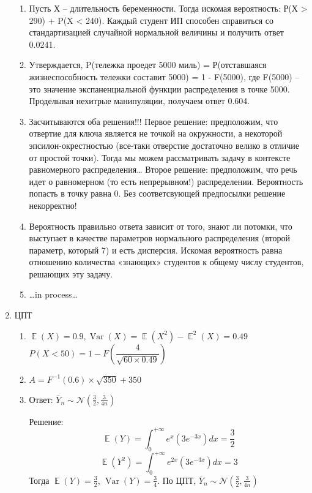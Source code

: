 \documentclass[11pt, a4paper]{article}
\DeclareMathOperator{\Var}{Var}
\DeclareMathOperator{\E}{\mathbb{E}}
\newcommand{\cN}{\mathcal{N}}
\theoremstyle{definition}
\begin{document}
\begin{enumerate}
\begin{enumerate}
    \item Пусть Х – длительность беременности. Тогда искомая вероятность: Р(Х > 290) + P(X < 240). Каждый студент ИП способен справиться со стандартизацией случайной нормальной величины и получить ответ 0.0241.
    \item Утверждается, P(тележка проедет 5000 миль) = Р(отставшаяся жизнеспособность тележки составит 5000) = 1 - F(5000), где F(5000) – это значение экспаненциальной функции распределения в точке 5000. Проделывая нехитрые манипуляции, получаем ответ 0.604.
    \item Засчитываются оба решения!!!
    Первое решение: предположим, что отвертие для ключа является не точкой на окружности, а некоторой эпсилон-окрестностью (все-таки отверстие достаточно велико в отличие от простой точки). Тогда мы можем рассматривать задачу в контексте равномерного распределения\ldots
    Второе решение: предположим, что речь идет о равномерном (то есть непрерывном!) распределении. Вероятность попасть в точку равна 0.
    Без соответсвующей предпосылки решение некорректно!
    \item Вероятность правильно ответа зависит от того, знают ли потомки, что выступает в качестве параметров нормального распределения (второй параметр, который 7) и есть дисперсия.
    Искомая вероятность равна отношению количества «знающих» студентов к общему числу студентов, решающих эту задачу.
    \item\ldots in process\ldots
\end{enumerate}    

    \item ЦПТ
    
    \begin{enumerate}
    
        \item
        $\E(X) = 0.9, \Var(X) = \E(X^2) - \E^2(X) = 0.49$\\
        $P(X<50)=1-F(\dfrac{4}{\sqrt{60 \times 0.49}})$
        
        \item $A = F^{-1}(0.6) \times \sqrt{350} + 350$
        
        \item Ответ: $\overline{Y}_n \sim \cN \left(\frac{3}{2}, \frac{3}{4n}\right) $

Решение: 
\[
\E(Y) = \int_{0}^{+\infty} e^{x} (3e^{-3x}) dx = \frac{3}{2}
\]
\[
\E(Y^2) = \int_{0}^{+\infty} e^{2x}(3e^{-3x}) dx =3
\]
Тогда $\E(Y) = \frac{3}{2}$, $\Var(Y) = \frac{3}{4}$. По ЦПТ, $\overline{Y}_n \sim \cN \left(\frac{3}{2}, \frac{3}{4n}\right) $
        

\end{enumerate}
\end{enumerate}
\end{document}
